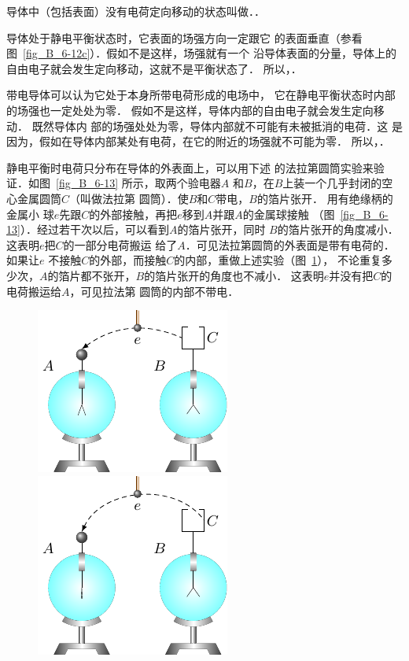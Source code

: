 导体中（包括表面）没有电荷定向移动的状态叫做．．

导体处于静电平衡状态时，它表面的场强方向一定跟它
的表面垂直（参看图~\ref{fig_B_6-12c}）．假如不是这样，场强就有一个
沿导体表面的分量，导体上的自由电子就会发生定向移动，这就不是平衡状态了．
所以，．

带电导体可以认为它处于本身所带电荷形成的电场中，
它在静电平衡状态时内部的场强也一定处处为零．
假如不是这样，导体内部的自由电子就会发生定向移动．
既然导体内
部的场强处处为零，导体内部就不可能有未被抵消的电荷．这
是因为，假如在导体内部某处有电荷，在它的附近的场强就不可能为零．
所以，．

静电平衡时电荷只分布在导体的外表面上，可以用下述
的法拉第圆筒实验来验证．如图~\ref{fig_B_6-13} 所示，取两个验电器$A$
和$B$，在$B$上装一个几乎封闭的空心金属圆筒$C$（叫做法拉第
圆筒）．使$B$和$C$带电，$B$的箔片张开．
用有绝缘柄的金属小
球$e$先跟$C$的外部接触，再把$e$移到$A$并跟$A$的金属球接触
（图~\ref{fig_B_6-13}）．经过若干次以后，可以看到$A$的箔片张开，同时
$B$的箔片张开的角度减小．这表明$e$把$C$的一部分电荷搬运
给了$A$．可见法拉第圆筒的外表面是带有电荷的．如果让$e$
不接触$C$的外部，而接触$C$的内部，重做上述实验（图~\ref{fig_B_6-14}），
不论重复多少次，$A$的箔片都不张开，$B$的箔片张开的角度也不减小．
这表明$e$并没有把$C$的电荷搬运给$A$，可见拉法第
圆筒的内部不带电．

\begin{figure}[htbp]
    \centering
    \begin{minipage}[t]{0.48\textwidth}
    \centering
    \includegraphics{fig/B/6-13.pdf}
    \caption{}\label{fig_B_6-13}
    \end{minipage}
    \begin{minipage}[t]{0.48\textwidth}
    \centering
    \includegraphics{fig/B/6-14.pdf}
    \caption{}\label{fig_B_6-14}
    \end{minipage}
\end{figure}

